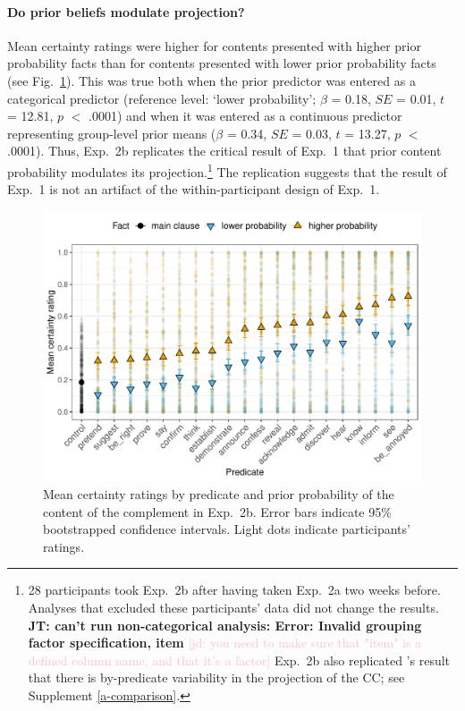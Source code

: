 \documentclass[11pt,fleqn]{article}
\newcommand{\jd}[1]{\textcolor{Pink}{[jd: #1]}}
\newcommand{\jt}[1]{\textbf{\color{blue}JT: #1}}
\newcommand{\figref}[1]{Fig.~\ref{#1}}
\newcommand{\6}{\mbox{$[\hspace*{-.6mm}[$}}
\newcommand{\9}{\mbox{$]\hspace*{-.6mm}]$}}
\newcommand{\citepos}[1]{\citeauthor{#1}'s \citeyear{#1}}
\begin{document}
\paragraph{Do prior beliefs modulate projection?} Mean certainty ratings were higher for contents  presented with higher prior probability facts than for contents presented with lower prior probability facts (see \figref{f-projection-mean-2b}). This was true both when the prior predictor was entered as a categorical predictor (reference level: `lower probability'; $\beta$ = 0.18, $SE$ = 0.01, $t$ = 12.81, $p$ $<$ .0001) and when it was entered as a continuous predictor representing group-level prior means ($\beta$ = 0.34, $SE$ = 0.03, $t$ = 13.27, $p$ $<$ .0001). Thus, Exp.~2b replicates the critical result of Exp.~1 that prior content probability modulates its projection.\footnote{28 participants took Exp.~2b after having taken Exp.~2a two weeks before. Analyses that excluded these participants' data did not change the results. \jt{can't run non-categorical analysis: Error: Invalid grouping factor specification, item} \jd{you need to make sure that "item" is a defined column name, and that it's a factor} Exp.~2b also replicated \citepos{tonhauser-degen-factive} result that there is by-predicate variability in the projection of the CC; see Supplement \ref{a-comparison}.}  The replication suggests that the result of Exp.~1 is not an artifact of the within-participant design of Exp.~1.

\begin{figure}[h!]
\centering

\includegraphics[width=.7\paperwidth]{../../results/3-projectivity/graphs/means-projectivity-by-predicate-and-prior}

\caption{Mean certainty ratings by predicate and prior probability of the content of the complement in Exp.~2b. Error bars indicate 95\% bootstrapped confidence intervals. Light dots indicate participants' ratings.} 
\label{f-projection-mean-2b}
\end{figure}
\end{document}
